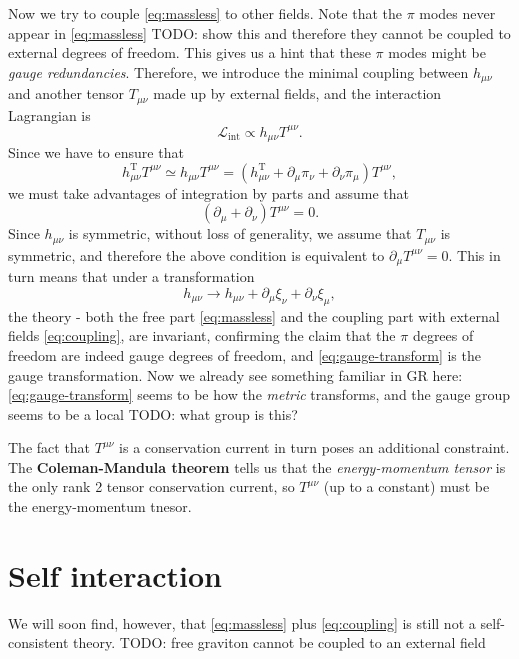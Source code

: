 \documentclass[hyperref, a4paper]{article}
\newcommand*{\concept}[1]{{\textbf{#1}}}
\begin{document}
Now we try to couple \eqref{eq:massless} to other fields. Note that the $\pi$ modes never appear 
in \eqref{eq:massless} TODO: show this 
and therefore they cannot be coupled to external degrees of freedom. This 
gives us a hint that these $\pi$ modes might be \emph{gauge redundancies}. Therefore, we introduce the minimal 
coupling between $h_{\mu \nu}$ and another tensor $T_{\mu \nu}$ made up by external fields, and the 
interaction Lagrangian is 
\begin{equation}
    \mathcal{L}_\text{int} \propto h_{\mu \nu} T^{\mu \nu} .
    \label{eq:coupling}
\end{equation}
Since we have to ensure that 
\[
    h_{\mu \nu}^\text{T} T^{\mu \nu} \simeq h_{\mu \nu} T^{\mu \nu} = (h_{\mu \nu}^\text{T} + \partial_\mu \pi_\nu + \partial_\nu \pi_\mu) T^{\mu \nu},
\] 
we must take advantages of integration by parts and assume that 
\[
    (\partial_\mu + \partial_\nu) T^{\mu \nu} = 0.
\]
Since $h_{\mu \nu}$ is symmetric, without loss of generality, we assume that $T_{\mu \nu}$ is symmetric, and 
therefore the above condition is equivalent to $\partial_\mu T^{\mu \nu} = 0$. This in turn means that 
under a transformation 
\begin{equation}
    h_{\mu \nu} \longrightarrow h_{\mu \nu} + \partial_\mu \xi_\nu + \partial_\nu \xi_\mu,
    \label{eq:gauge-transform}
\end{equation}
the theory - both the free part \eqref{eq:massless} and the coupling part with external fields \eqref{eq:coupling},
are invariant, confirming the claim that the $\pi$ degrees of freedom are indeed gauge degrees of freedom, and 
\eqref{eq:gauge-transform} is the gauge transformation. Now we already see something familiar in GR here: 
\eqref{eq:gauge-transform} seems to be how the \emph{metric} transforms, and the gauge group seems to be 
a local TODO: what group is this? 

The fact that $T^{\mu \nu}$ is a conservation current in turn poses an additional constraint. The 
\concept{Coleman-Mandula theorem} tells us that the \emph{energy-momentum tensor} is the only rank 2 tensor 
conservation current, so $T^{\mu \nu}$ (up to a constant) must be the energy-momentum tnesor.

\section{Self interaction}

We will soon find, however, that \eqref{eq:massless} plus \eqref{eq:coupling} is still not a self-consistent 
theory. TODO: free graviton cannot be coupled to an external field
\end{document}

